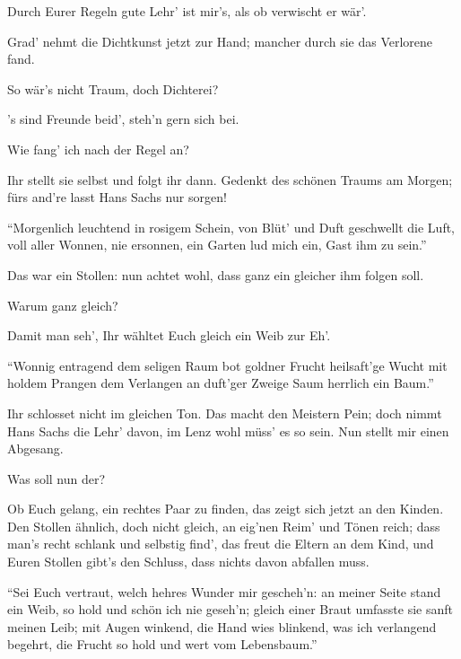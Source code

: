 \begin{drama}
\Waltherspeaks
Durch Eurer Regeln gute Lehr'
ist mir's, als ob verwischt er wär'.

\Sachsspeaks
Grad' nehmt die Dichtkunst jetzt zur Hand;
mancher durch sie das Verlorene fand.

\Waltherspeaks
So wär's nicht Traum, doch Dichterei?

\Sachsspeaks
's sind Freunde beid', steh'n gern sich bei.

\Waltherspeaks
Wie fang' ich nach der Regel an?

\Sachsspeaks
Ihr stellt sie selbst und folgt ihr dann.
Gedenkt des schönen Traums am Morgen;
fürs and're lasst Hans Sachs nur sorgen!

\Waltherspeaks
{}

``Morgenlich leuchtend in rosigem Schein,
von Blüt' und Duft geschwellt die Luft,
voll aller Wonnen, nie ersonnen,
ein Garten lud mich ein, Gast ihm zu sein.''

\Sachsspeaks
Das war ein Stollen:
nun achtet wohl,
dass ganz ein gleicher ihm folgen soll.

\Waltherspeaks
Warum ganz gleich?

\Sachsspeaks
Damit man seh',
Ihr wähltet Euch gleich ein Weib zur Eh'.

\Waltherspeaks
``Wonnig entragend dem seligen Raum
bot goldner Frucht heilsaft'ge Wucht
mit holdem Prangen dem Verlangen
an duft'ger Zweige Saum herrlich ein Baum.''

\Sachsspeaks
Ihr schlosset nicht im gleichen Ton.
Das macht den Meistern Pein;
doch nimmt Hans Sachs die Lehr' davon,
im Lenz wohl müss' es so sein.
Nun stellt mir einen Abgesang.

\Waltherspeaks
Was soll nun der?

\Sachsspeaks
Ob Euch gelang,
ein rechtes Paar zu finden,
das zeigt sich jetzt an den Kinden.
Den Stollen ähnlich, doch nicht gleich,
an eig'nen Reim' und Tönen reich;
dass man's recht schlank und selbstig find',
das freut die Eltern an dem Kind,
und Euren Stollen gibt's den Schluss,
dass nichts davon abfallen muss.

\Waltherspeaks
``Sei Euch vertraut,
welch hehres Wunder mir gescheh'n:
an meiner Seite stand ein Weib,
so hold und schön ich nie geseh'n;
gleich einer Braut
umfasste sie sanft meinen Leib;
mit Augen winkend,
die Hand wies blinkend,
was ich verlangend begehrt,
die Frucht so hold und wert
vom Lebensbaum.''


\end{drama}
